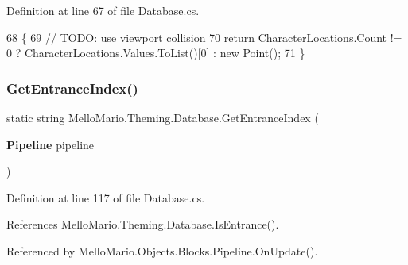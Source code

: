 Definition at line 67 of file Database.\+cs.


\begin{DoxyCode}
68         \{
69             \textcolor{comment}{// TODO: use viewport collision}
70             \textcolor{keywordflow}{return} CharacterLocations.Count != 0 ? CharacterLocations.Values.ToList()[0] : \textcolor{keyword}{new} Point();
71         \}
\end{DoxyCode}
\mbox{\label{classMelloMario_1_1Theming_1_1Database_ae250a55a50ed920475af0873c7494f76}} 
\subsubsection{Get\+Entrance\+Index()}
{\footnotesize\ttfamily static string Mello\+Mario.\+Theming.\+Database.\+Get\+Entrance\+Index (\begin{DoxyParamCaption}\item[{\textbf{ Pipeline}}]{pipeline }\end{DoxyParamCaption})\hspace{0.3cm}{\ttfamily [static]}}



Definition at line 117 of file Database.\+cs.



References Mello\+Mario.\+Theming.\+Database.\+Is\+Entrance().



Referenced by Mello\+Mario.\+Objects.\+Blocks.\+Pipeline.\+On\+Update().


